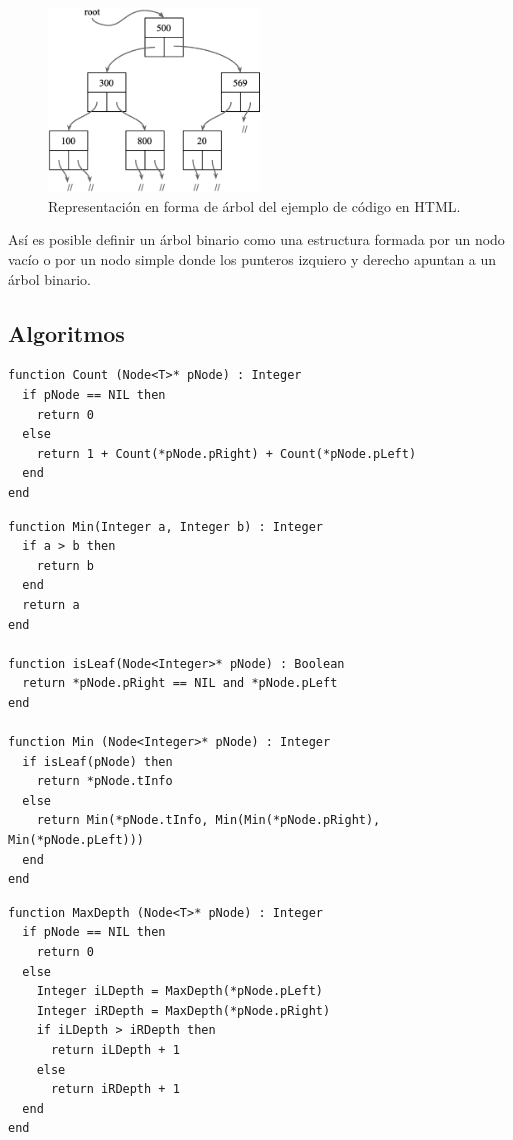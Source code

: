 \begin{figure}[htpb!]
  \begin{center}
    \includegraphics[width=0.5\textwidth]{images/BTPointer.eps}
  \end{center}
  \caption{Representación en forma de árbol del ejemplo de código en HTML.}
  \label{fig:BTPointer}
\end{figure}

Así es posible definir un árbol binario como una estructura formada por un nodo vacío o por un nodo simple donde los punteros izquiero y derecho apuntan a un árbol binario.


\subsection{Algoritmos}

\begin{lstlisting}[upquote=true, language=pseudo]
function Count (Node<T>* pNode) : Integer
  if pNode == NIL then
    return 0
  else
    return 1 + Count(*pNode.pRight) + Count(*pNode.pLeft)
  end
end
\end{lstlisting}

\begin{lstlisting}[upquote=true, language=pseudo]
function Min(Integer a, Integer b) : Integer
  if a > b then
    return b
  end
  return a
end

function isLeaf(Node<Integer>* pNode) : Boolean
  return *pNode.pRight == NIL and *pNode.pLeft
end

function Min (Node<Integer>* pNode) : Integer
  if isLeaf(pNode) then
    return *pNode.tInfo
  else
    return Min(*pNode.tInfo, Min(Min(*pNode.pRight), Min(*pNode.pLeft)))
  end
end
\end{lstlisting}

\begin{lstlisting}[upquote=true, language=pseudo]
function MaxDepth (Node<T>* pNode) : Integer
  if pNode == NIL then
    return 0
  else
    Integer iLDepth = MaxDepth(*pNode.pLeft)
    Integer iRDepth = MaxDepth(*pNode.pRight)
    if iLDepth > iRDepth then
      return iLDepth + 1
    else
      return iRDepth + 1
  end
end
\end{lstlisting}


